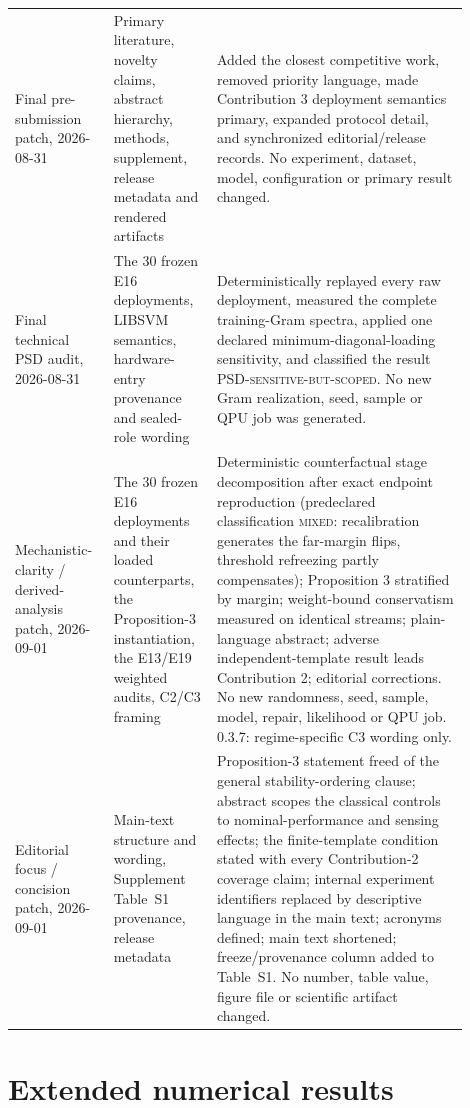 \documentclass[11pt,a4paper]{article}
\begin{document}
\begin{longtable}{>{\raggedright\arraybackslash}p{0.19\linewidth}>{\raggedright\arraybackslash}p{0.20\linewidth}>{\raggedright\arraybackslash}p{0.51\linewidth}}
Final pre-submission patch, 2026-08-31 & Primary literature, novelty claims, abstract hierarchy, methods, supplement, release metadata and rendered artifacts & Added the closest competitive work, removed priority language, made Contribution 3 deployment semantics primary, expanded protocol detail, and synchronized editorial/release records. No experiment, dataset, model, configuration or primary result changed. \\
Final technical PSD audit, 2026-08-31 & The 30 frozen E16 deployments, LIBSVM semantics, hardware-entry provenance and sealed-role wording & Deterministically replayed every raw deployment, measured the complete training-Gram spectra, applied one declared minimum-diagonal-loading sensitivity, and classified the result \textsc{PSD-sensitive-but-scoped}. No new Gram realization, seed, sample or QPU job was generated. \\
Mechanistic-clarity / derived-analysis patch, 2026-09-01 & The 30 frozen E16 deployments and their loaded counterparts, the Proposition-3 instantiation, the E13/E19 weighted audits, C2/C3 framing & Deterministic counterfactual stage decomposition after exact endpoint reproduction (predeclared classification \textsc{mixed}: recalibration generates the far-margin flips, threshold refreezing partly compensates); Proposition 3 stratified by margin; weight-bound conservatism measured on identical streams; plain-language abstract; adverse independent-template result leads Contribution 2; editorial corrections. No new randomness, seed, sample, model, repair, likelihood or QPU job. 0.3.7: regime-specific C3 wording only. \\
Editorial focus / concision patch, 2026-09-01 & Main-text structure and wording, Supplement Table~S1 provenance, release metadata & Proposition-3 statement freed of the general stability-ordering clause; abstract scopes the classical controls to nominal-performance and sensing effects; the finite-template condition stated with every Contribution-2 coverage claim; internal experiment identifiers replaced by descriptive language in the main text; acronyms defined; main text shortened; freeze/provenance column added to Table~S1. No number, table value, figure file or scientific artifact changed. \\
\bottomrule
\end{longtable}
\normalsize
\FloatBarrier

\section{Extended numerical results}
\end{document}
